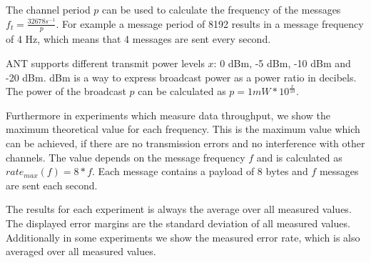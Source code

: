 The channel period $p$ can be used to calculate the frequency of the messages $f_t = \frac{32678s^{-1}}{p}$. For example a message period of 8192 results in a message frequency of 4 Hz, which means that 4 messages are sent every second.

ANT supports different transmit power levels $x$: 0 dBm, -5 dBm, -10 dBm and -20 dBm. dBm is a way to express broadcast power as a power ratio in decibels. The power of the broadcast $p$ can be calculated as $p = 1mW * 10^{\frac{x}{10}}$.

Furthermore in experiments which measure data throughput, we show the maximum theoretical value for each frequency. This is the maximum value which can be achieved, if there are no transmission errors and no interference with other channels. The value depends on the message frequency $f$ and is calculated as $rate_{max}(f) = 8*f$. Each message contains a payload of 8 bytes and $f$ messages are sent each second.

The results for each experiment is always the average over all measured values. The displayed error margins are the standard deviation of all measured values. Additionally in some experiments we show the measured error rate, which is also averaged over all measured values.
\newpage

